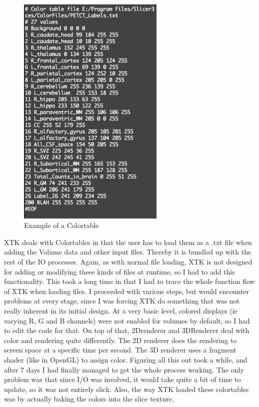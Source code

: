 \documentclass[a4paper,11pt,titlepage]{article}
\begin{document}
\begin{figure}[ht!]
\centering
\includegraphics[width=70mm]{graphics/Colortable_01.png}
\caption{Example of a Colortable}
\label{fig:UIdesign1}
\end{figure}

XTK deals with Colortables in that the user has to load them as a .txt file when adding the Volume data and other input files. Thereby it is bundled up with the rest of the IO processes. Again, as with normal file loading, XTK is not designed for adding or modifying these kinds of files at runtime, so I had to add this functionality. This took a long time in that I had to trace the whole function flow of XTK when loading files. I proceeded with various steps, but would encounter problems at every stage, since I was forcing XTK do something that was not really inherent in its initial design. At a very basic level, colored displays (ie varying R, G and B channels) were not enabled for volumes by default, so I had to edit the code for that. On top of that, 2Drenderer and 3DRenderer deal with color and rendering quite differently. The 2D renderer does the rendering to screen space at a specific time per second. The 3D renderer uses a fragment shader (like in OpenGL) to assign color. Figuring all this out took a while, and after 7 days I had finally managed to get the whole process working. The only problem was that since I/O was involved, it would take quite a bit of time to update, so it was not entirely slick. Also, the way XTK loaded these colortables was by actually baking the colors into the slice texture. 
\end{document}
